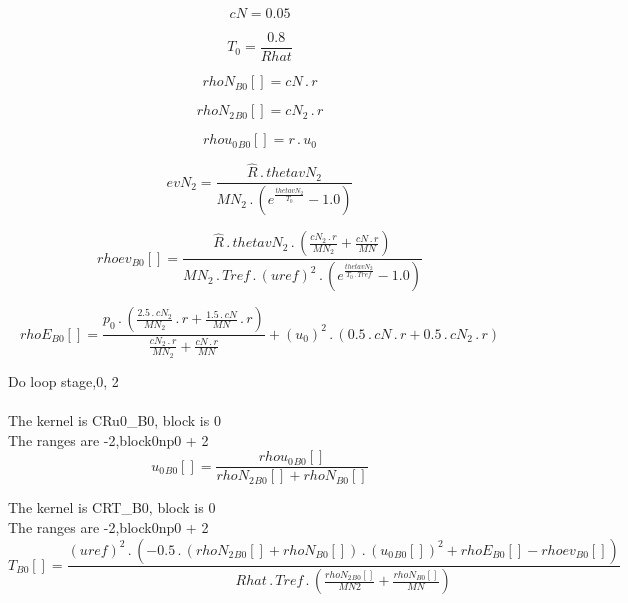 \documentclass{article}
\begin{document}
\begin{dmath}cN = 0.05\end{dmath}

\begin{dmath}T_{0} = \frac{0.8}{Rhat}\end{dmath}

\begin{dmath}{rhoN{_{B0}}}[{}] = cN \,.\, r\end{dmath}

\begin{dmath}{rhoN_{2}{_{B0}}}[{}] = cN_{2} \,.\, r\end{dmath}

\begin{dmath}{rhou_{0}{_{B0}}}[{}] = r \,.\, u_{0}\end{dmath}

\begin{dmath}evN_{2} = \frac{\hat{R} \,.\, thetavN_{2}}{MN_{2} \,.\, \left(e^{\frac{thetavN_{2}}{T_{0}}} - 1.0\right)}\end{dmath}

\begin{dmath}{rhoev{_{B0}}}[{}] = \frac{\hat{R} \,.\, thetavN_{2} \,.\, \left(\frac{cN_{2} \,.\, r}{MN_{2}} + \frac{cN \,.\, r}{MN}\right)}{MN_{2} \,.\, Tref \,.\, \left(uref \right)^{2} \,.\, \left(e^{\frac{thetavN_{2}}{T_{0} \,.\, Tref}} - 
1.0\right)}\end{dmath}

\begin{dmath}{rhoE{_{B0}}}[{}] = \frac{p_{0} \,.\, \left(\frac{2.5 \,.\, cN_{2}}{MN_{2}} \,.\, r + \frac{1.5 \,.\, cN}{MN} \,.\, r\right)}{\frac{cN_{2} \,.\, r}{MN_{2}} + \frac{cN \,.\, r}{MN}} + \left(u_{0} \right)^{2} \,.\, \left(0.5 \,.\, cN \,.\, 
r + 0.5 \,.\, cN_{2} \,.\, r\right)\end{dmath}

\noindent Do loop stage,0, 2\\
\\\noindent The kernel is CRu0_B0, block is 0\\\noindent The ranges are -2,block0np0 + 2\\\begin{dmath}{u_{0}{_{B0}}}[{}] = \frac{{rhou_{0}{_{B0}}}[{}]}{{rhoN_{2}{_{B0}}}[{}] + {rhoN{_{B0}}}[{}]}\end{dmath}

\noindent The kernel is CRT_B0, block is 0\\\noindent The ranges are -2,block0np0 + 2\\\begin{dmath}{T{_{B0}}}[{}] = \frac{\left(uref \right)^{2} \,.\, \left(- 0.5 \,.\, \left({rhoN_{2}{_{B0}}}[{}] + {rhoN{_{B0}}}[{}]\right) \,.\, \left({u_{0}{_{B0}}}[{}] \right)^{2} + {rhoE{_{B0}}}[{}] - {rhoev{_{B0}}}[{}]\right)}{Rhat \,.\, Tref 
\,.\, \left(\frac{{rhoN_{2}{_{B0}}}[{}]}{MN2} + \frac{{rhoN{_{B0}}}[{}]}{MN}\right)}\end{dmath}
\end{document}
